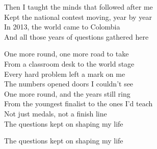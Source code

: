 \begin{lyrics}
Then I taught the minds that followed after me\\
Kept the national contest moving, year by year\\
In 2013, the world came to Colombia\\
And all those years of questions gathered here

One more round, one more road to take\\
From a classroom desk to the world stage\\
Every hard problem left a mark on me\\
The numbers opened doors I couldn’t see\\
One more round, and the years still ring\\
From the youngest finalist to the ones I’d teach\\
Not just medals, not a finish line\\
The questions kept on shaping my life

The questions kept on shaping my life
\end{lyrics}
